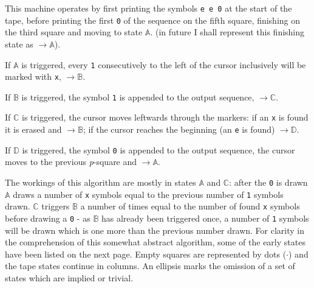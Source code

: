 \documentclass[Master.tex]{subfiles}
\begin{document}
This machine operates by first printing the symbols \texttt{e e 0} at the start of the tape, before printing the first \texttt{0} of the sequence on the fifth square, finishing on the third square and moving to state $\mathbb{A}$. (in future I shall represent this finishing state as $\rightarrow \mathbb{A}$).

If $\mathbb{A}$ is triggered, every \texttt{1} consecutively to the left of the cursor inclusively will be marked with \texttt{x}, $\rightarrow \mathbb{B}$.

If $\mathbb{B}$ is triggered, the symbol \texttt{1} is appended to the output sequence, $\rightarrow \mathbb{C}$.

If $\mathbb{C}$ is triggered, the cursor moves leftwards through the markers: if an \texttt{x} is found it is erased and $\rightarrow \mathbb{B}$; if the cursor reaches the beginning (an \texttt{e} is found) $\rightarrow \mathbb{D}$.

If $\mathbb{D}$ is triggered, the symbol \texttt{0} is appended to the output sequence, the cursor moves to the previous \textit{p}-square and $\rightarrow \mathbb{A}$.

The workings of this algorithm are mostly in states $\mathbb{A}$ and $\mathbb{C}$: after the \texttt{0} is drawn $\mathbb{A}$ draws a number of \texttt{x} symbols equal to the previous number of \texttt{1} symbols drawn. $\mathbb{C}$ triggers $\mathbb{B}$ a number of times equal to the number of found \texttt{x} symbols before drawing a \texttt{0} - as $\mathbb{B}$ has already been triggered once, a number of \texttt{1} symbols will be drawn which is one more than the previous number drawn. For clarity in the comprehension of this somewhat abstract algorithm, some of the early states have been listed on the next page. Empty squares are represented by dots ($\cdot$) and the tape states continue in columns. An ellipsis marks the omission of a set of states which are implied or trivial.
\end{document}

